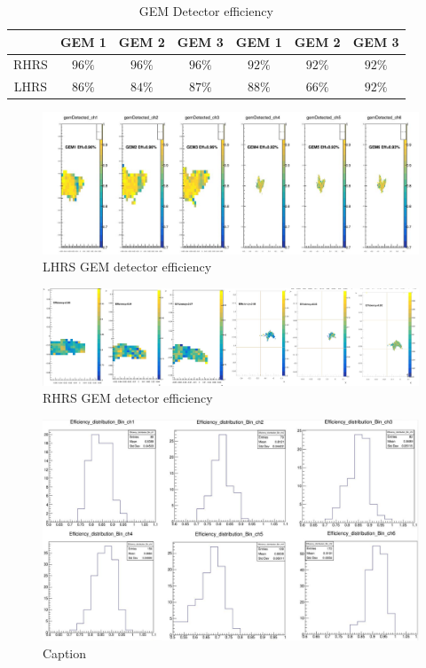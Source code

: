 \begin{table}[]
    \centering
    \begin{tabular}{c|c|c|c|c|c|c} \hline
         ~ & GEM 1 & GEM 2 & GEM 3 & GEM 1 & GEM 2 & GEM 3 \\ \hline 
         RHRS & $96\%$ & $96\%$ & $96\%$ & $92\%$& $92\%$& $92\%$  \\ \hline
         LHRS & $86\%$& $84\%$ & $87\%$ & $88\%$ & $66\%$ & $92\%$ \\ \hline
    \end{tabular}
    \caption{GEM Detector efficiency}
    \label{tab:gem_detector_efficiency_table}
\end{table}

\begin{figure}[!htbp]
    \centering
    \includegraphics[width=\textwidth]{images/chap5/lhrs_efficiency_2d.png}
    \caption{LHRS GEM detector efficiency}
    \label{fig:lhrs_efficiency_2d}
\end{figure}

\begin{figure}[!htbp]
    \centering
    \includegraphics[width=\textwidth]{images/chap5/rhrs_efficiency_2d.png}
    \caption{RHRS GEM detector efficiency}
    \label{fig:rhrs_efficiency_2d}
\end{figure}

\begin{figure}[!htbp]
    \centering
    \includegraphics[width=\textwidth]{images/chap5/lhrs_gem_bin_efficiency.png}
    \caption{Caption}
    \label{fig:lhrs_gem_bin_efficiency}
\end{figure}

